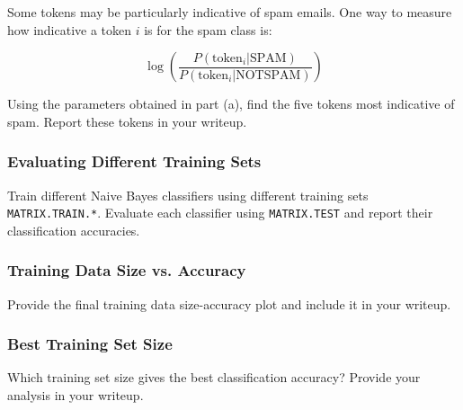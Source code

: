 \documentclass[lang=cn,11pt]{elegantbook}
\begin{document}
Some tokens may be particularly indicative of spam emails. One way to measure how indicative a token $i$ is for the spam class is:

\begin{equation}
    \log \left( \frac{P(\text{token}_i | \text{SPAM})}{P(\text{token}_i | \text{NOTSPAM})} \right)
\end{equation}

Using the parameters obtained in part (a), find the five tokens most indicative of spam. Report these tokens in your writeup.

\subsubsection{Evaluating Different Training Sets}

Train different Naive Bayes classifiers using different training sets \texttt{MATRIX.TRAIN.*}. Evaluate each classifier using \texttt{MATRIX.TEST} and report their classification accuracies.

\subsubsection{Training Data Size vs. Accuracy}

Provide the final training data size-accuracy plot and include it in your writeup.

\subsubsection{Best Training Set Size}

Which training set size gives the best classification accuracy? Provide your analysis in your writeup.
\end{document}

